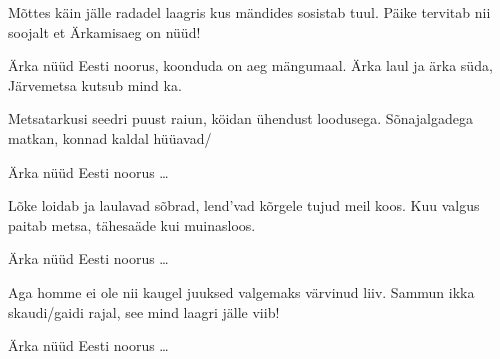 M\~ottes k\"ain j\"alle radadel laagris
kus m\"andides sosistab tuul. 
P\"aike tervitab nii soojalt
et \"Arkamisaeg on n\"u\"ud!

\"Arka n\"u\"ud Eesti noorus,
koonduda on aeg m\"angumaal.
\"Arka laul ja \"arka s\"uda,
J\"arvemetsa kutsub mind ka.

Metsatarkusi seedri puust raiun,
k\"oidan \"uhendust loodusega.
S\~onajalgadega matkan,
konnad kaldal h\"u\"uavad/

\"Arka n\"u\"ud Eesti noorus \ldots

L\~oke loidab ja laulavad s\~obrad,
lend'vad k\~orgele tujud meil koos.
Kuu valgus paitab metsa,
t\"ahesa\"ade kui muinasloos.

\"Arka n\"u\"ud Eesti noorus \ldots

Aga homme ei ole nii kaugel
juuksed valgemaks v\"arvinud liiv.
Sammun ikka skaudi/gaidi rajal,
see mind laagri j\"alle viib!

\"Arka n\"u\"ud Eesti noorus \ldots